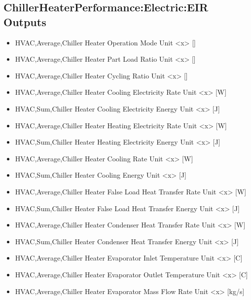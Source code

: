 \subsection{ChillerHeaterPerformance:Electric:EIR Outputs}\label{chillerheaterperformanceelectriceir-outputs}

\begin{itemize}
    \item
    HVAC,Average,Chiller Heater Operation Mode Unit \textless{}x\textgreater{} {[]}
    \item
    HVAC,Average,Chiller Heater Part Load Ratio Unit \textless{}x\textgreater{} {[]}
    \item
    HVAC,Average,Chiller Heater Cycling Ratio Unit \textless{}x\textgreater{} {[]}
    \item
    HVAC,Average,Chiller Heater Cooling Electricity Rate Unit \textless{}x\textgreater{} {[}W{]}
    \item
    HVAC,Sum,Chiller Heater Cooling Electricity Energy Unit \textless{}x\textgreater{} {[}J{]}
    \item
    HVAC,Average,Chiller Heater Heating Electricity Rate Unit \textless{}x\textgreater{} {[}W{]}
    \item
    HVAC,Sum,Chiller Heater Heating Electricity Energy Unit \textless{}x\textgreater{} {[}J{]}
    \item
    HVAC,Average,Chiller Heater Cooling Rate Unit \textless{}x\textgreater{} {[}W{]}
    \item
    HVAC,Sum,Chiller Heater Cooling Energy Unit \textless{}x\textgreater{} {[}J{]}
    \item
    HVAC,Average,Chiller Heater False Load Heat Transfer Rate Unit \textless{}x\textgreater{} {[}W{]}
    \item
    HVAC,Sum,Chiller Heater False Load Heat Transfer Energy Unit \textless{}x\textgreater{} {[}J{]}
    \item
    HVAC,Average,Chiller Heater Condenser Heat Transfer Rate Unit \textless{}x\textgreater{} {[}W{]}
    \item
    HVAC,Sum,Chiller Heater Condenser Heat Transfer Energy Unit \textless{}x\textgreater{} {[}J{]}
    \item
    HVAC,Average,Chiller Heater Evaporator Inlet Temperature Unit \textless{}x\textgreater{} {[}C{]}
    \item
    HVAC,Average,Chiller Heater Evaporator Outlet Temperature Unit \textless{}x\textgreater{} {[}C{]}
    \item
    HVAC,Average,Chiller Heater Evaporator Mass Flow Rate Unit \textless{}x\textgreater{} {[}kg/s{]}

\end{itemize}
